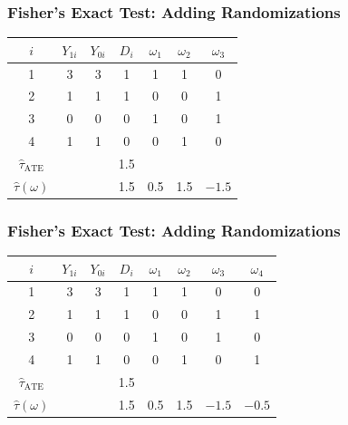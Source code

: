 \documentclass[xcolor=dvipsnames]{beamer}
\begin{document}
\begin{frame}
\frametitle{Fisher's Exact Test: Adding Randomizations}
\smallskip
\begin{tabular}{@{} c c c c !{\color{gray!50}\vrule} c c c @{}}
\toprule
$i$ & $Y_{1i}$ & $Y_{0i}$ & $D_i$ & $\omega_1$ & $\omega_2$ & $\omega_3$ \\
 & 3 & \textcolor{red!70!black}{3} & 1 & 1 & 1 & 0 \\
  2 & 1 & \textcolor{red!70!black}{1} & 1 & 0 & 0 & 1 \\
  3 & \textcolor{red!70!black}{0} & 0 & 0 & 1 & 0 & 1 \\
                    4 & \textcolor{red!70!black}{1} & 1 & 0 & 0 & 1 & 0 \\
\midrule
$\widehat{\tau}_{\text{ATE}}$ & & & 1.5 & & & \\
$\hat\tau(\omega)$ & & & 1.5 & 0.5 & 1.5 & $-1.5$ \\
\bottomrule
\end{tabular}
\end{frame}

\begin{frame}
\frametitle{Fisher's Exact Test: Adding Randomizations}
\smallskip
\begin{tabular}{@{} c c c c !{\color{gray!50}\vrule} c c c c @{}}
\toprule
$i$ & $Y_{1i}$ & $Y_{0i}$ & $D_i$ & $\omega_1$ & $\omega_2$ & $\omega_3$ & $\omega_4$ \\
 & 3 & \textcolor{red!70!black}{3} & 1 & 1 & 1 & 0 & 0 \\
  2 & 1 & \textcolor{red!70!black}{1} & 1 & 0 & 0 & 1 & 1 \\
                    3 & \textcolor{red!70!black}{0} & 0 & 0 & 1 & 0 & 1 & 0 \\
  4 & \textcolor{red!70!black}{1} & 1 & 0 & 0 & 1 & 0 & 1 \\
\midrule
$\widehat{\tau}_{\text{ATE}}$ & & & 1.5 & & & & \\
$\hat\tau(\omega)$ & & & 1.5 & 0.5 & 1.5 & $-1.5$ & $-0.5$ \\
\bottomrule
\end{tabular}
\end{frame}
\end{document}
